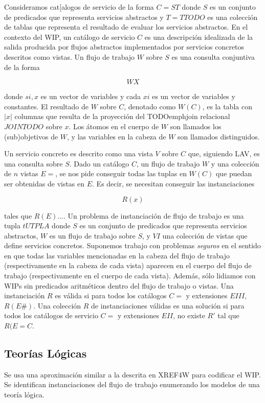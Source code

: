 \documentclass{article}
\begin{document}
Consideramos cat[alogos de servicio de la forma $C = ST$ donde $S$ es un
conjunto de predicados que representa servicios abstractos y $T=TTODO$ es una
colección de tablas que representa el resultado de evaluar los servicios
abstractos. En el contexto del WIP, un catálogo de servicio $C$ es una
descripción idealizada de la salida producida por flujos abstractos
implementados por servicios concretos descritos como vistas. Un flujo de trabajo
$W$ sobre $S$ es una consulta conjuntiva de la forma

$$
WX
$$

donde $si,x$ es un vector de variables y cada $xi$ es un vector de variables y
constantes. El resultado de $W$ sobre $C$, denotado como $W(C)$, es la tabla con
$|x|$ columnas que resulta de la proyección del TODOemphjoin relacional
$JOINTODO$ sobre $x$. Los átomos en el cuerpo de $W$ son llamados los
(sub)objetivos de $W$, y las variables en la cabeza de $W$ son llamados
distinguidos.

Un servicio concreto es descrito como una vista $V$ sobre $C$ que, siguiendo
LAV, es una consulta sobre $S$. Dado un catálogo $C$, un flujo de trabajo $W$ y
una colección de $n$ vistas $E=$, se nos pide conseguir todas las tuplas en
$W(C)$ que puedan ser obtenidas de vistas en $E$. Es decir, se necesitan
conseguir las instanciaciones

$$
R(x)
$$

tales que $R(E)...$. Un problema de instanciación de flujo de trabajo es una
tupla $tUTPLA$ donde $S$ es un conjunto de predicados que representa servicios
abstractos, $W$ es un flujo de trabajo sobre $S$, y $VI$ una colección de vistas
que define servicios concretos. Suponemos trabajo con problemas \emph{seguros}
en el sentido en que todas las variables mencionadas en la cabeza del flujo de
trabajo (respectivamente en la cabeza de cada vista) aparecen en el cuerpo del
flujo de trabajo (respectivamente en el cuerpo de cada vista). Además, sólo
lidiamos con WIPs sin predicados aritméticos dentro del flujo de trabajo o
vistas. Una instanciación $R$ es válida si para todos los catálogos $C=$ y
extensiones $EIII$, $R(E\#)$. Una colección $R$ de instanciaciones válidas es una
solución si para todos los catálogos de servicio $C=$ y extensiones $EII$, no
existe $R'$ tal que $R(E= C$.

\subsection{Teorías Lógicas}

Se usa una aproximación similar a la descrita en XREF4W para codificar el WIP.
Se identifican instanciaciones del flujo de trabajo enumerando los modelos de
una teoría lógica.
\end{document}
